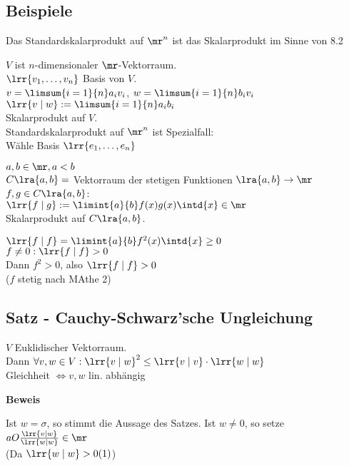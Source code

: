 \subsection{Beispiele}
		\item Das Standardskalarprodukt auf $\mr^n$ ist das Skalarprodukt im Sinne von 8.2
		\item $V$ ist $n$-dimensionaler $\mr$-Vektorraum.\\
			$\lrr{v_1,\dots,v_n}$ Basis von $V$.\\
			$v=\limsum{i=1}{n}a_iv_i$, $w=\limsum{i=1}{n}b_iv_i$\\
			$\lrr{v\mid w}:=\limsum{i=1}{n}a_ib_i$\\
			Skalarprodukt auf $V$.\\
			Standardskalarprodukt auf $\mr^n$ ist Spezialfall:\\
			Wähle Basis $\lrr{e_1,\dots,e_n}$
		\item $a,b\in\mr, a<b$\\
			$C\lra{a,b}=$ Vektorraum der stetigen Funktionen $\lra{a,b}\rightarrow\mr$\\
			$f,g\in C\lra{a,b}$:\\
			$\lrr{f\mid g}:=\limint{a}{b}f(x)g(x)\intd{x}\in\mr$\\
			Skalarprodukt auf $C\lra{a,b}$.\\
				\item $\lrr{f\mid f}=\limint{a}{b}f^2(x)\intd{x}\geq 0$\\
					$f\neq 0: \lrr{f\mid f}>0$\\
					Dann $f^2>0$, also $\lrr{f\mid f}> 0$\\
					($f$ stetig nach MAthe 2)
			\subExEnd
	\subExEnd
	
\subsection{Satz - Cauchy-Schwarz'sche Ungleichung}
	$V$ Euklidischer Vektorraum.\\
	Dann $\forall v,w\in V: \lrr{v\mid w}^2\leq\lrr{v\mid v}\cdot\lrr{w\mid w}$\\
	Gleichheit $\Leftrightarrow v,w$ lin. abhängig
	
	\textbf{Beweis}
	
	Ist $w=\sigma$, so stimmt die Aussage des Satzes. Ist $w\neq 0$, so setze $aO\frac{\lrr{v\mid w}}{\lrr{w\mid w}}\in\mr$\\
	(Da $\lrr{w\mid w}> 0 (1)$)
	
